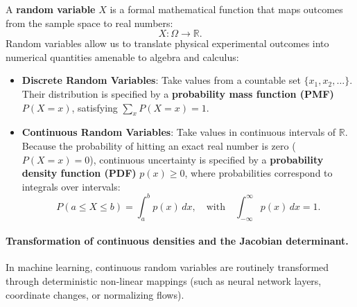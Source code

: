 A \textbf{random variable} $X$ is a formal mathematical function that maps outcomes from the sample space to real numbers:
\begin{equation}
X: \Omega \to \mathbb{R}.
\end{equation}
Random variables allow us to translate physical experimental outcomes into numerical quantities amenable to algebra and calculus:
\begin{itemize}[noitemsep]
  \item \textbf{Discrete Random Variables}: Take values from a countable set $\{x_1, x_2, \dots\}$. Their distribution is specified by a \textbf{probability mass function (PMF)} $P(X = x)$, satisfying $\sum_x P(X = x) = 1$.
  \item \textbf{Continuous Random Variables}: Take values in continuous intervals of $\mathbb{R}$. Because the probability of hitting an exact real number is zero ($P(X = x) = 0$), continuous uncertainty is specified by a \textbf{probability density function (PDF)} $p(x) \ge 0$, where probabilities correspond to integrals over intervals:
  \begin{equation}
  P(a \le X \le b) = \int_a^b p(x) \, dx, \quad \text{with} \quad \int_{-\infty}^\infty p(x) \, dx = 1.
  \end{equation}
\end{itemize}

\paragraph{Transformation of continuous densities and the Jacobian determinant.}
In machine learning, continuous random variables are routinely transformed through deterministic non-linear mappings (such as neural network layers, coordinate changes, or normalizing flows). 

